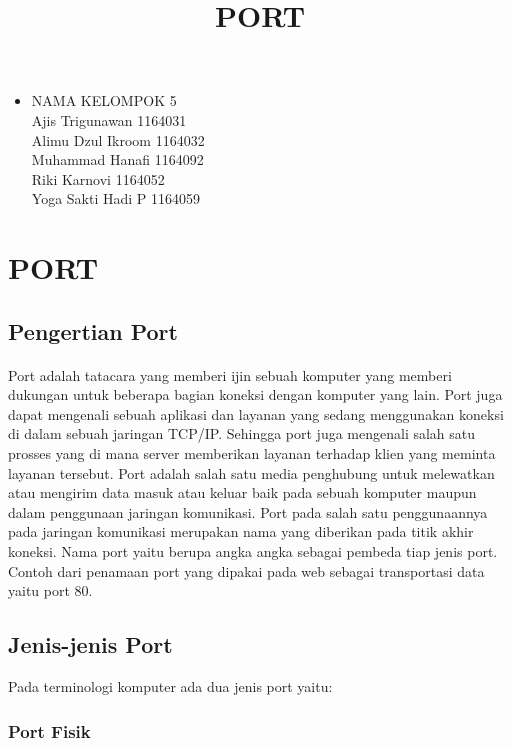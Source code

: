\documentclass[12pt,a4paper]{article}
\begin{document}
\title{PORT}
\date{}
\maketitle

\begin{itemize}
\item
NAMA KELOMPOK 5\\
Ajis Trigunawan			1164031\\
Alimu Dzul Ikroom		1164032\\
Muhammad Hanafi			1164092\\
Riki Karnovi			1164052\\
Yoga Sakti Hadi P		1164059\\
\end{itemize}

\section{PORT}
\subsection{Pengertian Port}
\paragraph{}
\hspace{1cm}
Port adalah tatacara yang memberi ijin sebuah komputer yang memberi dukungan untuk beberapa bagian koneksi dengan komputer yang lain. Port juga dapat mengenali sebuah aplikasi dan layanan yang sedang menggunakan koneksi di dalam sebuah jaringan TCP/IP. Sehingga port juga mengenali salah satu prosses yang di mana server memberikan layanan terhadap klien yang meminta layanan tersebut. Port adalah salah satu media penghubung untuk melewatkan atau mengirim data masuk atau keluar baik pada sebuah komputer maupun dalam penggunaan jaringan komunikasi. Port pada salah satu penggunaannya pada jaringan komunikasi merupakan nama yang diberikan pada titik akhir koneksi. Nama port yaitu berupa angka angka sebagai pembeda tiap  jenis port. Contoh dari penamaan port yang dipakai pada web sebagai transportasi data yaitu port 80.


\subsection{Jenis-jenis Port}
Pada terminologi komputer ada dua jenis port yaitu:
\subsubsection {Port Fisik}
\end{document}
